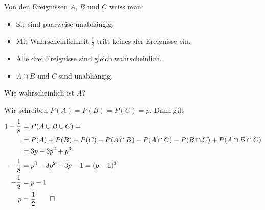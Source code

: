 Von den Ereignissen $A$, $B$ und $C$ weiss man:
\begin{itemize}
\item Sie sind paarweise unabhängig.
\item Mit Wahrscheinlichkeit $\frac18$ tritt keines der
Ereignisse ein.
\item Alle drei Ereignisse sind gleich wahrscheinlich.
\item $A\cap B$ und $C$ sind unabhängig.
\end{itemize}
Wie wahrscheinlich ist $A$?

\begin{loesung}
Wir schreiben $P(A)=P(B)=P(C)=p$. Dann gilt
\begin{align*}
1-\frac18&=
P(A\cup B\cup C)=
\\
&=P(A)+P(B)+P(C) -P(A\cap B)-P(A\cap C)-P(B\cap C)+P(A\cap B\cap C)
\\
&=3p-3p^2+p^3
\\
-\frac18&=p^3-3p^2+3p-1=(p-1)^3
\\
-\frac12&=p-1\\
p&=\frac12
\qedhere
\end{align*}
\end{loesung}

